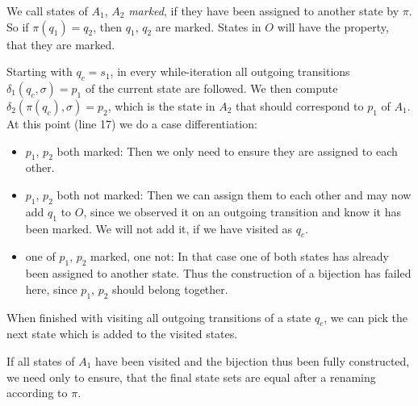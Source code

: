 We call states of $A_1$, $A_2$ \emph{marked}, if they have been assigned to another state by $\pi$. So if $\pi(q_1)=q_2$, then $q_1$, $q_2$ are marked. States in $O$ will have the property, that they are marked.

Starting with $q_c = s_1$, in every while-iteration all outgoing transitions $\delta_1(q_c, \sigma) = p_1$ of the current state are followed. We then compute $\delta_2(\pi(q_c), \sigma) = p_2$, which is the state in $A_2$ that should correspond to $p_1$ of $A_1$. At this point (line 17) we do a case differentiation:
\begin{itemize}
	\item $p_1$, $p_2$ both marked: Then we only need to ensure they are assigned to each other.
	\item $p_1$, $p_2$ both not marked: Then we can assign them to each other and may now add $q_1$ to $O$, since we observed it on an outgoing transition and know it has been marked. We will not add it, if we have visited as $q_c$.
	\item one of $p_1$, $p_2$ marked, one not: In that case one of both states has already been assigned to another state. Thus the construction of a bijection has failed here, since $p_1$, $p_2$ should belong together.
\end{itemize}
When finished with visiting all outgoing transitions of a state $q_c$, we can pick the next state which is added to the visited states.

If all states of $A_1$ have been visited and the bijection thus been fully constructed, we need only to ensure, that the final state sets are equal after a renaming according to $\pi$.
